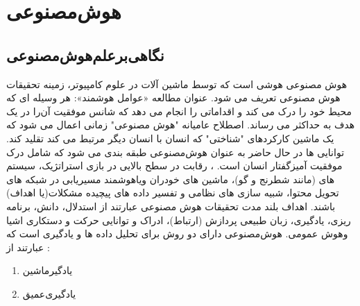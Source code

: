 \chapter{هوش‌مصنوعی}
\section{نگاهی‌برعلم‌هوش‌مصنوعی}
هوش مصنوعی‌ هوشی است که توسط
ماشین آلات در علوم کامپیوتر، زمینه تحقیقات هوش مصنوعی تعریف می شود. 
 عنوان مطالعه «عوامل هوشمند»: هر وسیله ای که
محیط خود را درک می کند و اقداماتی را انجام می دهد که  شانس موفقیت آن‌را در یک هدف به حداکثر می رساند. 
 اصطلاح عامیانه
"هوش مصنوعی" زمانی اعمال می شود که یک ماشین  کارکردهای "شناختی" که انسان با انسان دیگر مرتبط می کند تقلید کند. 
 توانایی ها
در حال حاضر به عنوان هوش‌مصنوعی طبقه بندی می شود که شامل درک موفقیت آمیزگفتار انسان است. ،
 رقابت در سطح بالایی در بازی استراتژیک، 
سیستم های (مانند شطرنج و گو)، ماشین های خودران و‌یا‌هوشمند
مسیریابی در شبکه های تحویل محتوا، شبیه سازی های نظامی و
تفسیر داده های پیچیده
مشکلات(یا اهداف)  باشند. اهداف بلند مدت تحقیقات هوش مصنوعی عبارتند از
استدلال، دانش، برنامه ریزی، یادگیری، زبان طبیعی
پردازش (ارتباط)، ادراک و توانایی
حرکت و دستکاری اشیا وهوش عمومی.  
هوش‌مصنوعی دارای دو روش برای تحلیل داده ها و یادگیری است که عبارتند از :
\begin{enumerate}
    \item{یادگیر‌ماشین }
    \item{یادگیری‌عمیق }
\end{enumerate}
